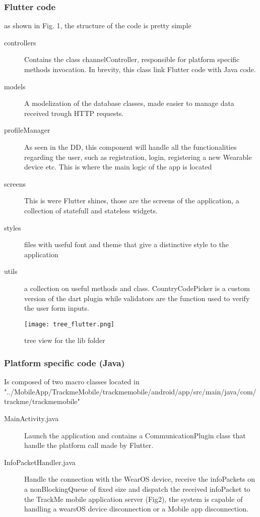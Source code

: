 \documentclass[../main.tex]{subfiles}
\begin{document}
\subsubsection{Flutter code}
as shown in Fig. 1, the structure of the code is pretty simple
\begin{description}
	\item[controllers] Contains the class channelController, responsible for platform specific methods invocation. In brevity, this class link Flutter code with Java code.
	\item[models] A modelization of the database classes, made easier to manage data received trough HTTP requests.
	\item[profileManager] As seen in the DD, this component will handle all the functionalities regarding the user, such as registration, login, registering a new Wearable device etc. This is where the main logic of the app is located
	\item[screens] This is were Flutter shines, those are the screens of the application, a collection of statefull and stateless widgets.
	\item[styles] files with useful font and theme that give a distinctive style to the application
	\item[utils] a collection on useful methods and class. CountryCodePicker is a custom version of the dart plugin while validators are the function used to verify the user form inputs.
\end{description}





	\begin{figure}[H]
		\centering
		\texttt{[image: tree\_flutter.png]}
		\caption{tree view for the lib folder}
		\label{fig:lib_tree.png}
	\end{figure}

\subsubsection{Platform specific code (Java)}
Is composed of two macro classes located in \\ "../MobileApp/TrackmeMobile/trackmemobile/android/app/src/main/java/com/trackme/trackmemobile"
\begin{description}
	\item[MainActivity.java] Launch the application and contains a CommunicationPlugin class that handle the platform call made by Flutter.
	\item[InfoPacketHandler.java] Handle the connection with the WearOS device, receive the infoPackets on a nonBlockingQueue of fixed size
	 and dispatch the received infoPacket to the TrackMe mobile application server (Fig2), the system is capable of handling a wearsOS device disconnection
	 or a Mobile app disconnection. 
\end{description}
\end{document}
